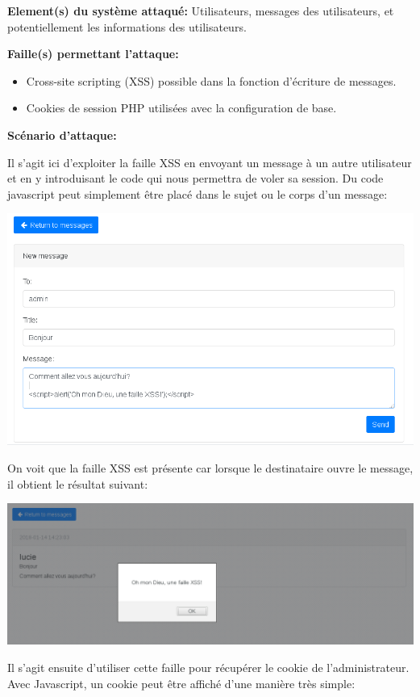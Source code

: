 \documentclass{article}
\begin{document}
\textbf{Element(s) du système attaqué:} Utilisateurs, messages des
utilisateurs, et potentiellement les informations des utilisateurs.

\textbf{Faille(s) permettant l'attaque:}

\begin{itemize}
\tightlist
\item
  Cross-site scripting (XSS) possible dans la fonction d'écriture de
  messages.
\item
  Cookies de session PHP utilisées avec la configuration de base.
\end{itemize}

\textbf{Scénario d'attaque:}

Il s'agit ici d'exploiter la faille XSS en envoyant un message à un
autre utilisateur et en y introduisant le code qui nous permettra de
voler sa session. Du code javascript peut simplement être placé dans le
sujet ou le corps d'un message:

\includegraphics{images/xss1.png}

On voit que la faille XSS est présente car lorsque le destinataire ouvre
le message, il obtient le résultat suivant:

\includegraphics{images/xss2.png}

Il s'agit ensuite d'utiliser cette faille pour récupérer le cookie de
l'administrateur. Avec Javascript, un cookie peut être affiché d'une
manière très simple:
\end{document}

